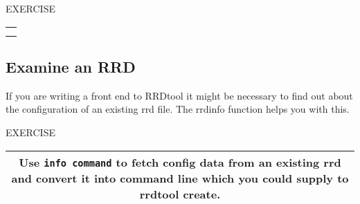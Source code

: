 \documentclass[a4paper,12pt]{article}
\newenvironment{work}{\textsf{\tiny EXERCISE}\nopagebreak\\[0.3ex]\begin{tabular}{|c|}
 \hline
 \begin{minipage}{0.965\linewidth}%
 \setlength{\parskip}{1.6ex plus 0.6ex minus 0.4ex}%
 \rule{0pt}{2.8ex}\ignorespaces}
{\rule[-1.8ex]{0pt}{0pt}\end{minipage}\\
 \hline
 \end{tabular}}
\newcommand{\ex}[1]{\subsection{#1}}
\newcommand{\cmd}[1]{\texttt{\mbox{#1}}}
\begin{document}
\begin{work}
\ex{Web Charting}

With browsers improving their abilities, rrdtools native charting abilities
are not so important anymore. One might wish to draw his charts in the
browser, using the \href{http://d3js.org/}{D3.js} library or one of the charting libraries based on it like Rickshaw or Nvd3.

\begin{work}
Use the \cmd{xport} function to extract chart data from an rrd file and create a chart using the d3 library.
\end{work} 

\ex{Examine an RRD}

If you are writing a front end to RRDtool it might be necessary to
find out about the configuration of an existing rrd file. The rrdinfo
function helps you with this.

\begin{work}
  Use \texttt{info command} to fetch config data from an existing rrd
  and convert it into command line which you could supply to rrdtool
  create.
\end{work}
\end{document}
